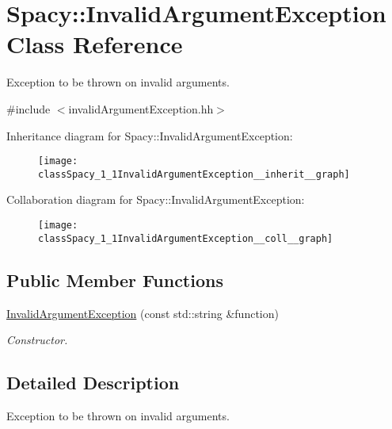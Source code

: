 \hypertarget{classSpacy_1_1InvalidArgumentException}{}\section{Spacy\+:\+:Invalid\+Argument\+Exception Class Reference}
\label{classSpacy_1_1InvalidArgumentException}


Exception to be thrown on invalid arguments.  




{\ttfamily \#include $<$invalid\+Argument\+Exception.\+hh$>$}



Inheritance diagram for Spacy\+:\+:Invalid\+Argument\+Exception\+:\nopagebreak
\begin{figure}[H]
\begin{center}
\leavevmode
\texttt{[image: classSpacy\_1\_1InvalidArgumentException\_\_inherit\_\_graph]}
\end{center}
\end{figure}


Collaboration diagram for Spacy\+:\+:Invalid\+Argument\+Exception\+:\nopagebreak
\begin{figure}[H]
\begin{center}
\leavevmode
\texttt{[image: classSpacy\_1\_1InvalidArgumentException\_\_coll\_\_graph]}
\end{center}
\end{figure}
\subsection*{Public Member Functions}
\begin{DoxyCompactItemize}
\item 
\hyperlink{classSpacy_1_1InvalidArgumentException_a557df70a4e73ec5b447ce6b57f5ec7a3_a557df70a4e73ec5b447ce6b57f5ec7a3}{Invalid\+Argument\+Exception} (const std\+::string \&function)
\begin{DoxyCompactList}\small\item\em Constructor. \end{DoxyCompactList}\end{DoxyCompactItemize}


\subsection{Detailed Description}
Exception to be thrown on invalid arguments. 

